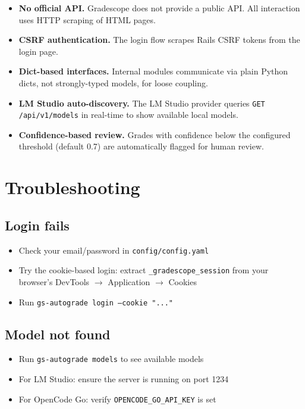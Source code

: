 \documentclass[11pt,a4paper]{article}
\begin{document}
\begin{itemize}[itemsep=3pt]
    \item \textbf{No official API.} Gradescope does not provide a public API. All interaction uses HTTP scraping of HTML pages.
    \item \textbf{CSRF authentication.} The login flow scrapes Rails CSRF tokens from the login page.
    \item \textbf{Dict-based interfaces.} Internal modules communicate via plain Python dicts, not strongly-typed models, for loose coupling.
    \item \textbf{LM Studio auto-discovery.} The LM Studio provider queries \texttt{GET /api/v1/models} in real-time to show available local models.
    \item \textbf{Confidence-based review.} Grades with confidence below the configured threshold (default 0.7) are automatically flagged for human review.
\end{itemize}

\section{Troubleshooting}

\subsection{Login fails}

\begin{itemize}[itemsep=3pt]
    \item Check your email/password in \texttt{config/config.yaml}
    \item Try the cookie-based login: extract \texttt{\_gradescope\_session} from your browser's DevTools $\rightarrow$ Application $\rightarrow$ Cookies
    \item Run \texttt{gs-autograde login --cookie "..."}
\end{itemize}

\subsection{Model not found}

\begin{itemize}[itemsep=3pt]
    \item Run \texttt{gs-autograde models} to see available models
    \item For LM Studio: ensure the server is running on port 1234
    \item For OpenCode Go: verify \texttt{OPENCODE\_GO\_API\_KEY} is set
\end{itemize}
\end{document}
